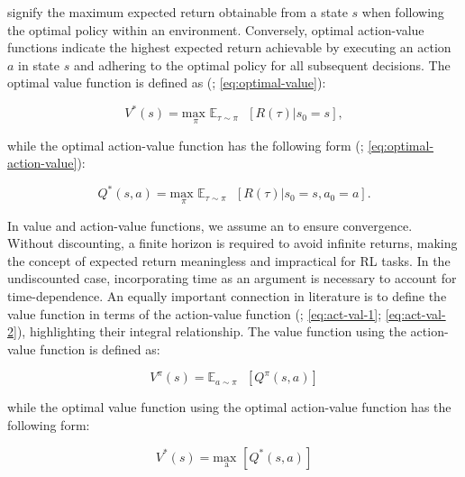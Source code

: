     \noindent {} signify the maximum expected return obtainable from a state $s$ when following the optimal policy within an environment. Conversely, optimal action-value functions indicate the highest expected return achievable by executing an action $a$ in state $s$ and adhering to the optimal policy for all subsequent decisions. The optimal value function is defined as (\textcolor{deepblue}{\cite{Sutton1998}; \autoref{eq:optimal-value}}):
    
    \begin{equation}
        V^{*}(s) = \underset{\pi}{\text{max }} \mathbb{E}_{\tau \sim \pi} \text{ }[R(\tau) | s_0 = s],
        \label{eq:optimal-value}
    \end{equation}
    
    \noindent while the optimal action-value function has the following form (\textcolor{deepblue}{\cite{Sutton1998}; \autoref{eq:optimal-action-value}}):
    
    \begin{equation}
        Q^{*}(s, a) = \underset{\pi}{\text{max }} \mathbb{E}_{\tau \sim \pi} \text{ }[R(\tau) | s_0 = s, a_0 = a].
        \label{eq:optimal-action-value}
    \end{equation}
    
    \noindent In value and action-value functions, we assume an  to ensure convergence. Without discounting, a finite horizon is required to avoid infinite returns, making the concept of expected return meaningless and impractical for RL tasks. In the undiscounted case, incorporating time as an argument is necessary to account for time-dependence. An equally important connection in literature is to define the value function in terms of the action-value function (\textcolor{deepblue}{\cite{Sutton1998}; \autoref{eq:act-val-1}; \autoref{eq:act-val-2}}), highlighting their integral relationship. The value function using the action-value function is defined as:
    
    \begin{equation}
        V^{\pi}(s) = \mathbb{E}_{a \sim \pi} \text{ }[Q^{\pi}(s, a)]
        \label{eq:act-val-1}
    \end{equation}
    
    \noindent while the optimal value function using the optimal action-value function has the following form:
    
    \begin{equation}
        V^{*}(s) = \underset{\text{a}}{\text{max }} [Q^{*}(s, a)]
        \label{eq:act-val-2}
    \end{equation}
    

